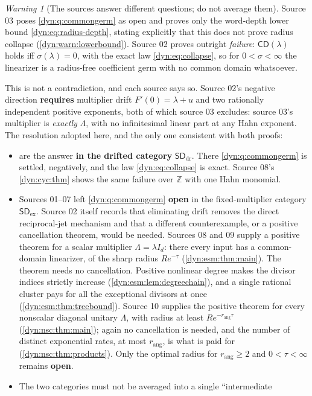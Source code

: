 \documentclass[11pt,letterpaper]{article}
\theoremstyle{definition}
\theoremstyle{remark}
\newtheorem{warning}[warning]{Warning}
\newcommand{\Z}{\mathbb Z}
\newcommand{\sddr}{\mathsf{SD}_{\mathrm{dr}}}
\newcommand{\sdex}{\mathsf{SD}_{\mathrm{ex}}}
\newcommand{\rang}{r_{\mathrm{ang}}}
\numberwithin{equation}{section}
\begin{document}
\begin{warning}[The sources answer different questions; do not average
them]\label{dyn:warn:resolution}
Source 03 poses \cref{dyn:q:commongerm} as open and proves only the
word-depth lower bound \eqref{dyn:eq:radius-depth}, stating explicitly that
this does not prove radius collapse (\cref{dyn:warn:lowerbound}). Source 02
proves outright \emph{failure}: $\mathsf{CD}(\lambda)$ holds iff
$\sigma(\lambda)=0$, with the exact law \eqref{dyn:eq:collapse}, so for
$0<\sigma<\infty$ the linearizer is a radius-free coefficient germ with no
common domain whatsoever.

This is not a contradiction, and each source says so. Source 02's negative
direction \textbf{requires} multiplier drift $F'(0)=\lambda+u$ and two
rationally independent positive exponents, both of which source 03
excludes: source 03's multiplier is \emph{exactly} $\Lambda$, with no
infinitesimal linear part at any Hahn exponent. The resolution adopted
here, and the only one consistent with both proofs:
\begin{itemize}
\item {} are the answer
\textbf{in the drifted category} $\sddr$. There
\cref{dyn:q:commongerm} is settled, negatively, and the law
\eqref{dyn:eq:collapse} is exact. Source 08's \cref{dyn:cyc:thm} shows the
same failure over $\Z$ with one Hahn monomial.
\item Sources 01--07 left \cref{dyn:q:commongerm} \textbf{open} in the
fixed-multiplier category $\sdex$. Source 02 itself records that
eliminating drift removes the direct reciprocal-jet mechanism and that a
different counterexample, or a positive cancellation theorem, would be
needed. Sources 08 and 09 supply a positive theorem for a scalar multiplier
$\Lambda=\lambda I_d$: there every input has a common-domain linearizer, of
the sharp radius $Re^{-\tau}$ (\cref{dyn:esm:thm:main}). The theorem needs
no cancellation. Positive nonlinear degree makes the divisor indices
strictly increase (\cref{dyn:esm:lem:degreechain}), and a single rational
cluster pays for all the exceptional divisors at once
(\cref{dyn:esm:thm:treebound}). Source 10 supplies the positive theorem for
every nonscalar diagonal unitary $\Lambda$, with radius at least
$Re^{-\rang\tau}$ (\cref{dyn:nsc:thm:main}); again no cancellation is
needed, and the number of distinct exponential rates, at most $\rang$, is
what is paid for (\cref{dyn:nsc:thm:products}). Only the optimal radius for
$\rang\ge2$ and $0<\tau<\infty$ remains \textbf{open}.
\item The two categories must not be averaged into a single ``intermediate

\end{itemize}
\end{warning}
\end{document}
